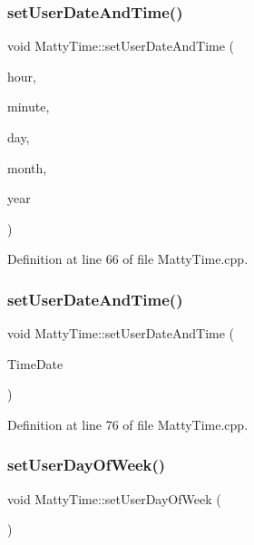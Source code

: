 \subsubsection{\texorpdfstring{set\+User\+Date\+And\+Time()}{setUserDateAndTime()}\hspace{0.1cm}{\footnotesize\ttfamily [4/5]}}
{\footnotesize\ttfamily void Matty\+Time\+::set\+User\+Date\+And\+Time (\begin{DoxyParamCaption}\item[{int}]{hour,  }\item[{int}]{minute,  }\item[{int}]{day,  }\item[{int}]{month,  }\item[{int}]{year }\end{DoxyParamCaption})}



Definition at line 66 of file Matty\+Time.\+cpp.

\hypertarget{classMattyTime_ae470fb0341c517348ec3ea7d606f67c5}{}\label{classMattyTime_ae470fb0341c517348ec3ea7d606f67c5} 
\subsubsection{\texorpdfstring{set\+User\+Date\+And\+Time()}{setUserDateAndTime()}\hspace{0.1cm}{\footnotesize\ttfamily [5/5]}}
{\footnotesize\ttfamily void Matty\+Time\+::set\+User\+Date\+And\+Time (\begin{DoxyParamCaption}\item[{\hyperlink{structTimeAndDate}{Time\+And\+Date}}]{Time\+Date }\end{DoxyParamCaption})}



Definition at line 76 of file Matty\+Time.\+cpp.

\hypertarget{classMattyTime_a12b0e0b9c4d45248da89e2d4078d4d08}{}\label{classMattyTime_a12b0e0b9c4d45248da89e2d4078d4d08} 
\subsubsection{\texorpdfstring{set\+User\+Day\+Of\+Week()}{setUserDayOfWeek()}}
{\footnotesize\ttfamily void Matty\+Time\+::set\+User\+Day\+Of\+Week (\begin{DoxyParamCaption}{ }\end{DoxyParamCaption})}



